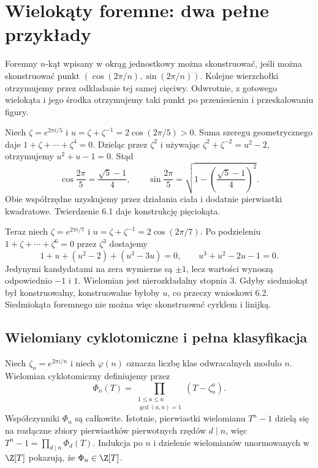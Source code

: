 \section{Wielokąty foremne: dwa pełne przykłady}

Foremny $n$-kąt wpisany w okrąg jednostkowy można skonstruować, jeśli można skonstruować punkt $(\cos(2\pi/n),\sin(2\pi/n))$. Kolejne wierzchołki otrzymujemy przez odkładanie tej samej cięciwy. Odwrotnie, z gotowego wielokąta i jego środka otrzymujemy taki punkt po przeniesieniu i przeskalowaniu figury.

\begin{przyklad}[Pięciokąt]
Niech $\zeta=e^{2\pi i/5}$ i $u=\zeta+\zeta^{-1}=2\cos(2\pi/5)>0$. Suma szeregu geometrycznego daje $1+\zeta+\cdots+\zeta^4=0$. Dzieląc przez $\zeta^2$ i używając $\zeta^2+\zeta^{-2}=u^2-2$, otrzymujemy $u^2+u-1=0$. Stąd
\[
\cos\frac{2\pi}{5}=\frac{\sqrt5-1}{4},\qquad
\sin\frac{2\pi}{5}=\sqrt{1-\left(\frac{\sqrt5-1}{4}\right)^2}.
\]
Obie współrzędne uzyskujemy przez działania ciała i dodatnie pierwiastki kwadratowe. Twierdzenie 6.1 daje konstrukcję pięciokąta.
\end{przyklad}

\begin{przyklad}[Siedmiokąt]
Teraz niech $\zeta=e^{2\pi i/7}$ i $u=\zeta+\zeta^{-1}=2\cos(2\pi/7)$. Po podzieleniu $1+\zeta+\cdots+\zeta^6=0$ przez $\zeta^3$ dostajemy
\[
1+u+(u^2-2)+(u^3-3u)=0,\qquad u^3+u^2-2u-1=0.
\]
Jedynymi kandydatami na zera wymierne są $\pm1$, lecz wartości wynoszą odpowiednio $-1$ i $1$. Wielomian jest nierozkładalny stopnia $3$. Gdyby siedmiokąt był konstruowalny, konstruowalne byłoby $u$, co przeczy wnioskowi 6.2. Siedmiokąta foremnego nie można więc skonstruować cyrklem i linijką.
\end{przyklad}

\subsection*{Wielomiany cyklotomiczne i pełna klasyfikacja}

Niech $\zeta_n=e^{2\pi i/n}$ i niech $\varphi(n)$ oznacza liczbę klas odwracalnych modulo $n$. Wielomian cyklotomiczny definiujemy przez
\[
\Phi_n(T)=\prod_{\substack{1\le a\le n\\\gcd(a,n)=1}}(T-\zeta_n^a).
\]
Współczynniki $\Phi_n$ są całkowite. Istotnie, pierwiastki wielomianu $T^n-1$ dzielą się na rozłączne zbiory pierwiastków pierwotnych rzędów $d\mid n$, więc
$T^n-1=\prod_{d\mid n}\Phi_d(T)$. Indukcja po $n$ i dzielenie wielomianów unormowanych w $\Z[T]$ pokazują, że $\Phi_n\in\Z[T]$.

